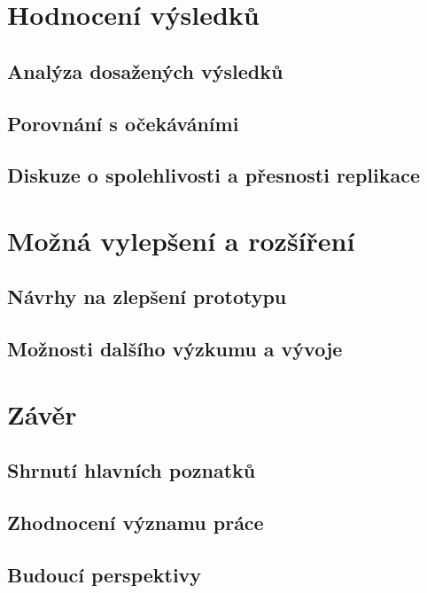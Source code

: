 \chapter{Hodnocení výsledků}
\section{Analýza dosažených výsledků}
\section{Porovnání s očekáváními}
\section{Diskuze o spolehlivosti a přesnosti replikace}

\chapter{Možná vylepšení a rozšíření}
\section{Návrhy na zlepšení prototypu}
\section{Možnosti dalšího výzkumu a vývoje}

\chapter{Závěr}
\section{Shrnutí hlavních poznatků}
\section{Zhodnocení významu práce}
\section{Budoucí perspektivy}


%
